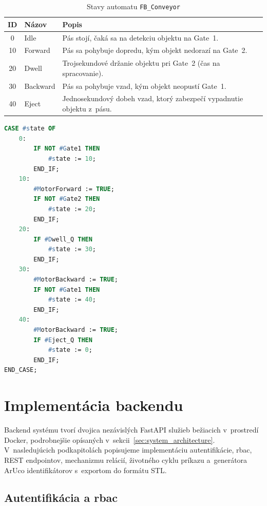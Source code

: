 \begin{table}[H]
\centering
\caption{Stavy automatu \texttt{FB\_Conveyor}}
\label{tab:fb_states}
\begin{tabular}{|c|l|p{8cm}|}
\hline
\textbf{ID} & \textbf{Názov} & \textbf{Popis} \\
\hline
0  & Idle      & Pás stojí, čaká sa na detekciu objektu na Gate~1. \\
10 & Forward   & Pás sa pohybuje dopredu, kým objekt nedorazí na Gate~2. \\
20 & Dwell     & Trojsekundové držanie objektu pri Gate~2 (čas na spracovanie). \\
30 & Backward  & Pás sa pohybuje vzad, kým objekt neopustí Gate~1. \\
40 & Eject     & Jednosekundový dobeh vzad, ktorý zabezpečí vypadnutie objektu z~pásu. \\
\hline
\end{tabular}
\end{table}

\newpage
\begin{lstlisting}[style=code-listing, language=Pascal, caption={Jadro stavového automatu \texttt{FB\_Conveyor}}, label={lst:fb_states}]
CASE #state OF
    0:
        IF NOT #Gate1 THEN
            #state := 10;
        END_IF;
    10:
        #MotorForward := TRUE;
        IF NOT #Gate2 THEN
            #state := 20;
        END_IF;
    20:
        IF #Dwell_Q THEN
            #state := 30;
        END_IF;
    30:
        #MotorBackward := TRUE;
        IF NOT #Gate1 THEN
            #state := 40;
        END_IF;
    40:
        #MotorBackward := TRUE;
        IF #Eject_Q THEN
            #state := 0;
        END_IF;
END_CASE;
\end{lstlisting}


\section{Implementácia backendu}
Backend systému tvorí dvojica nezávislých FastAPI služieb bežiacich v~prostredí
Docker, podrobnejšie opísaných v~sekcii~\ref{sec:system_architecture}.
V~nasledujúcich podkapitolách popisujeme implementáciu autentifikácie, \acrshort{rbac},
REST endpointov, mechanizmu relácií, životného cyklu príkazu a~generátora ArUco
identifikátorov s~exportom do formátu STL.

\subsection{Autentifikácia a \acrshort{rbac}}

